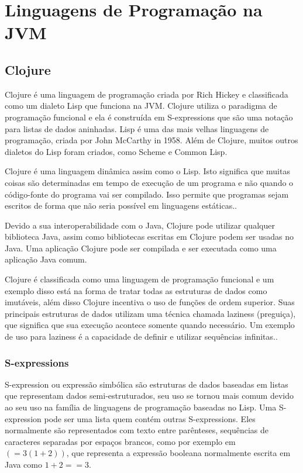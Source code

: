 \chapter{Linguagens de Programação na JVM}

\vspace{-1.9cm}

  \section{Clojure}

  Clojure é uma linguagem de programação criada por Rich Hickey e classificada como um dialeto \ac{Lisp} que funciona na \ac{JVM}. Clojure utiliza o paradigma de programação funcional e ela é construída em S-expressions que são uma notação para listas de dados aninhadas. \ac{Lisp} é uma das mais velhas linguagens de programação, criada por John McCarthy in 1958. Além de Clojure, muitos outros dialetos do \ac{Lisp} foram criados, como Scheme e Common Lisp.

  Clojure é uma linguagem dinâmica assim como o \ac{Lisp}. Isto significa que muitas coisas são determinadas em tempo de execução de um programa e não quando o código-fonte do programa vai ser compilado. Isso permite que programas sejam escritos de forma que não seria possível em linguagens estáticas.\cite{clojureInAction}.

  Devido a sua interoperabilidade com o Java, Clojure pode utilizar qualquer biblioteca Java, assim como bibliotecas escritas em Clojure podem ser usadas no Java. Uma aplicação Clojure pode ser compilada e ser executada como uma aplicação Java comum.

  Clojure é classificada como uma linguagem de programação funcional e um exemplo disso está na forma de tratar todas as estruturas de dados como imutáveis, além disso Clojure incentiva o uso de funções de ordem superior. Suas principais estruturas de dados utilizam uma técnica chamada laziness (preguiça), que significa que sua execução acontece somente quando necessário. Um exemplo de uso para laziness é a capacidade de definir e utilizar sequências infinitas.\cite{clojureInAction}.

    \subsection{S-expressions}

    S-expression ou expressão simbólica são estruturas de dados baseadas em listas que representam dados semi-estruturados, seu uso se tornou mais comum devido ao seu uso na família de linguagens de programação baseadas no \ac{Lisp}. Uma S-expression pode ser uma lista quem contém outras S-expressions. Eles normalmente são representados com texto entre parênteses, sequências de caracteres separadas por espaços brancos, como por exemplo em $(= 3 (1 + 2))$, que representa a expressão booleana normalmente escrita em Java como $1 + 2 == 3$.

